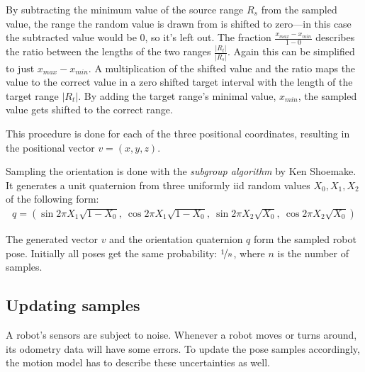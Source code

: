 \documentclass[Thesis.tex]{subfiles}
\begin{document}
By subtracting the minimum value of the source range $R_s$ from the sampled value, the range the random value is drawn from is shifted to zero---in this case the subtracted value would be $0$, so it's left out. The fraction $\frac{ x_{max} - x_{min} }{ 1 - 0 }$ describes the ratio between the lengths of the two ranges $\frac{|R_t|}{|R_s|}$. Again this can be simplified to just $x_{max}-x_{min}$. A multiplication of the shifted value and the ratio maps the value to the correct value in a zero shifted target interval with the length of the target range $|R_t|$. By adding the target range's minimal value, $x_{min}$, the sampled value gets shifted to the correct range.

This procedure is done for each of the three positional coordinates, resulting in the positional vector $v = \left(x, y, z\right)$.

Sampling the orientation is done with the \emph{subgroup algorithm} by Ken Shoemake\cite[p.~129-130]{gfxgems:1995}. It generates a unit quaternion from three uniformly \gls{iid} random values $X_0, X_1, X_2$ of the following form:
%
\begin{align}
q = \left( \sin{2\pi X_1}\sqrt{1-X_0},\: \cos{2\pi X_1}\sqrt{1-X_0},\: 
           \sin{2\pi X_2}\sqrt{  X_0},\: \cos{2\pi X_2}\sqrt{  X_0} \right)
\end{align}


The generated vector $v$ and the orientation quaternion $q$ form the sampled robot pose. Initially all poses get the same probability: $\nicefrac{1}{n}$, where $n$ is the number of samples.

\subsection{Updating samples}\label{sec:update_samples}

A robot's sensors are subject to noise. Whenever a robot moves or turns around, its odometry data will have some errors.
To update the pose samples accordingly, the motion model has to describe these uncertainties as well.
\end{document}
